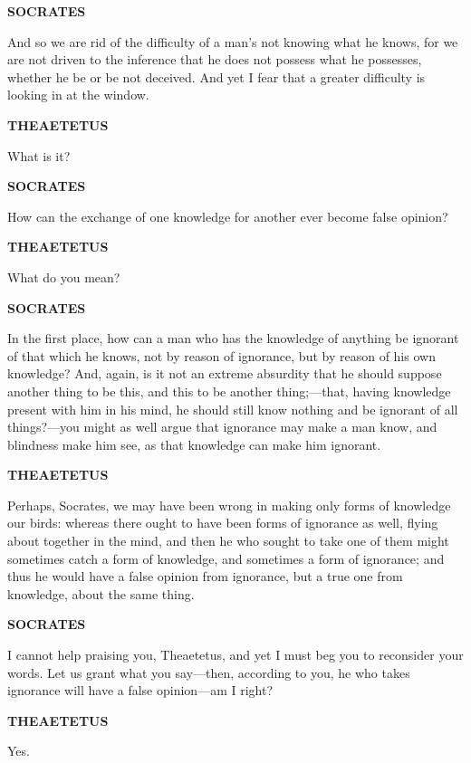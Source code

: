 \documentclass[11pt,letter]{article}
\begin{document}
\par \textbf{SOCRATES}
\par   And so we are rid of the difficulty of a man's not knowing what he knows, for we are not driven to the inference that he does not possess what he possesses, whether he be or be not deceived. And yet I fear that a greater difficulty is looking in at the window.

\par \textbf{THEAETETUS}
\par   What is it?

\par \textbf{SOCRATES}
\par   How can the exchange of one knowledge for another ever become false opinion?

\par \textbf{THEAETETUS}
\par   What do you mean?

\par \textbf{SOCRATES}
\par   In the first place, how can a man who has the knowledge of anything be ignorant of that which he knows, not by reason of ignorance, but by reason of his own knowledge? And, again, is it not an extreme absurdity that he should suppose another thing to be this, and this to be another thing;—that, having knowledge present with him in his mind, he should still know nothing and be ignorant of all things?—you might as well argue that ignorance may make a man know, and blindness make him see, as that knowledge can make him ignorant.

\par \textbf{THEAETETUS}
\par   Perhaps, Socrates, we may have been wrong in making only forms of knowledge our birds:  whereas there ought to have been forms of ignorance as well, flying about together in the mind, and then he who sought to take one of them might sometimes catch a form of knowledge, and sometimes a form of ignorance; and thus he would have a false opinion from ignorance, but a true one from knowledge, about the same thing.

\par \textbf{SOCRATES}
\par   I cannot help praising you, Theaetetus, and yet I must beg you to reconsider your words. Let us grant what you say—then, according to you, he who takes ignorance will have a false opinion—am I right?

\par \textbf{THEAETETUS}
\par   Yes.
\end{document}
